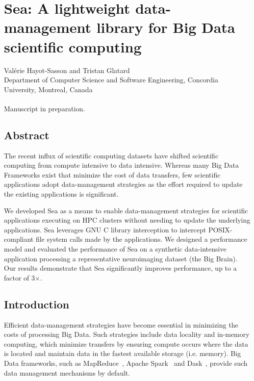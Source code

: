 \chapter{Sea: A lightweight data-management library for Big Data scientific
computing}\label{chapter:sea-comp}

Val\'erie Hayot-Sasson and Tristan Glatard \\
\begingroup \footnotesize Department of Computer Science and Software
Engineering, Concordia University, Montreal, Canada \\
\endgroup 
\vspace{5pt} \\
Manuscript in preparation. \\

\section{Abstract}

The recent influx of scientific computing datasets have shifted scientific
computing from compute intensive to data intensive. Whereas many Big Data
Frameworks exist that minimize the cost of data transfers, few scientific
applications adopt data-management strategies as the effort required to update
the existing applications is significant.

We developed Sea as a means to enable data-management strategies for scientific
applications executing on HPC clusters without needing to update the underlying
applications. Sea leverages GNU C library interception to intercept
POSIX-compliant file system calls made by the applications. We designed a
performance model and evaluated the performance of Sea on a synthetic
data-intensive application processing a representative neuroimaging dataset (the
Big Brain). Our results demonstrate that Sea significantly improves performance,
up to a factor of 3$\times$. 

\section{Introduction}\label{sec:seacomp:introduction} Efficient data-management
strategies have become essential in minimizing the costs of processing Big Data.
Such strategies include data locality and in-memory computing, which minimize
transfers by ensuring compute occurs where the data is located and maintain data
in the fastest available storage (i.e. memory). Big Data frameworks, such as
MapReduce~\cite{dean2008mapreduce}, Apache Spark~\cite{zaharia2016apache} and
Dask~\cite{rocklin2015dask}, provide such data management mechanisms by default.

